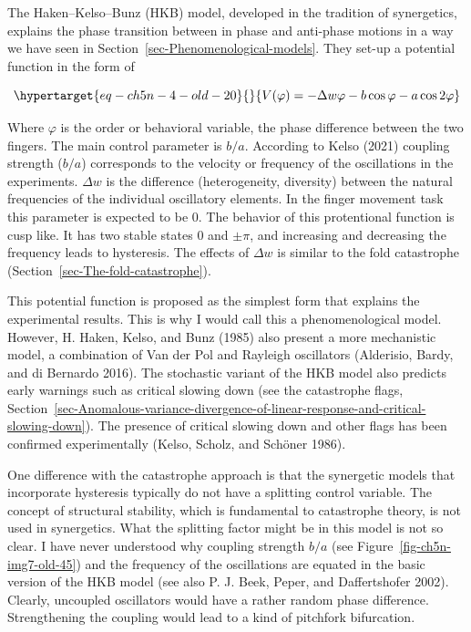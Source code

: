\documentclass[
  a4paper,
  DIV=11,
  numbers=noendperiod,
  oneside]{scrreprt}
\begin{document}
The Haken--Kelso--Bunz (HKB) model, developed in the tradition of
synergetics, explains the phase transition between in phase and
anti-phase motions in a way we have seen in
Section~\ref{sec-Phenomenological-models}. They set-up a potential
function in the form of

\begin{equation}\protect\hypertarget{eq-ch5n-4-old-20}{}{
V(\varphi) = - \Delta w\varphi - b\cos\varphi - a\cos{2\varphi}}\label{eq-ch5n-4-old-20}\end{equation}

Where \(\varphi\) is the order or behavioral variable, the phase
difference between the two fingers. The main control parameter is
\(b/a\). According to Kelso (2021) coupling strength (\(b/a\))
corresponds to the velocity or frequency of the oscillations in the
experiments. \(\Delta w\) is the difference (heterogeneity, diversity)
between the natural frequencies of the individual oscillatory elements.
In the finger movement task this parameter is expected to be 0. The
behavior of this protentional function is cusp like. It has two stable
states 0 and \(\pm \pi\), and increasing and decreasing the frequency
leads to hysteresis. The effects of \(\Delta w\) is similar to the fold
catastrophe (Section~\ref{sec-The-fold-catastrophe}).

This potential function is proposed as the simplest form that explains
the experimental results. This is why I would call this a
phenomenological model. However, H. Haken, Kelso, and Bunz (1985) also
present a more mechanistic model, a combination of Van der Pol and
Rayleigh oscillators (Alderisio, Bardy, and di Bernardo 2016). The
stochastic variant of the HKB model also predicts early warnings such as
critical slowing down (see the catastrophe flags,
Section~\ref{sec-Anomalous-variance-divergence-of-linear-response-and-critical-slowing-down}).
The presence of critical slowing down and other flags has been confirmed
experimentally (Kelso, Scholz, and Schöner 1986).

One difference with the catastrophe approach is that the synergetic
models that incorporate hysteresis typically do not have a splitting
control variable. The concept of structural stability, which is
fundamental to catastrophe theory, is not used in synergetics. What the
splitting factor might be in this model is not so clear. I have never
understood why coupling strength \(b/a\) (see
Figure~\ref{fig-ch5n-img7-old-45}) and the frequency of the oscillations
are equated in the basic version of the HKB model (see also P. J. Beek,
Peper, and Daffertshofer 2002). Clearly, uncoupled oscillators would
have a rather random phase difference. Strengthening the coupling would
lead to a kind of pitchfork bifurcation.
\end{document}
